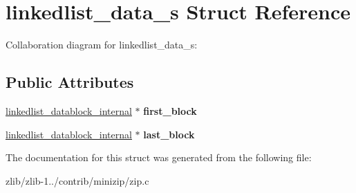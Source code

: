 \hypertarget{structlinkedlist__data__s}{\section{linkedlist\+\_\+data\+\_\+s Struct Reference}
\label{structlinkedlist__data__s}
}


Collaboration diagram for linkedlist\+\_\+data\+\_\+s\+:
\subsection*{Public Attributes}
\begin{DoxyCompactItemize}
\item 
\hypertarget{structlinkedlist__data__s_aa0a9c876ad4a05aa5969d8888fb57cdb}{\hyperlink{structlinkedlist__datablock__internal__s}{linkedlist\+\_\+datablock\+\_\+internal} $\ast$ {\bfseries first\+\_\+block}}\label{structlinkedlist__data__s_aa0a9c876ad4a05aa5969d8888fb57cdb}

\item 
\hypertarget{structlinkedlist__data__s_a26afdb5141483c909dafb8c5fd016bb8}{\hyperlink{structlinkedlist__datablock__internal__s}{linkedlist\+\_\+datablock\+\_\+internal} $\ast$ {\bfseries last\+\_\+block}}\label{structlinkedlist__data__s_a26afdb5141483c909dafb8c5fd016bb8}

\end{DoxyCompactItemize}


The documentation for this struct was generated from the following file\+:\begin{DoxyCompactItemize}
\item 
zlib/zlib-\/1../contrib/minizip/zip.\+c\end{DoxyCompactItemize}
